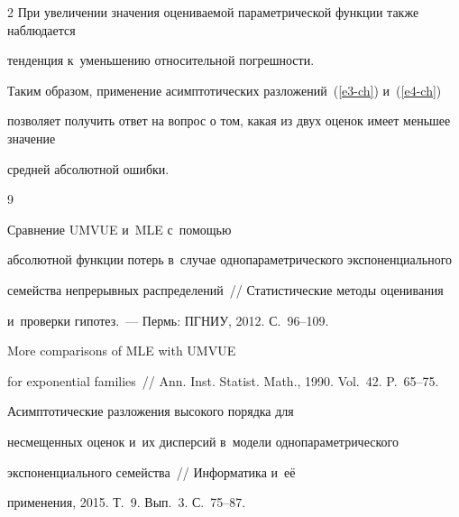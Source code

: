 \begin{multicols}{2}
 При увеличении значения оцениваемой параметрической функции также наблюдается


 тенденция к~уменьшению относительной погрешности.





 Таким образом, применение асимптотических разложений~(\ref{e3-ch}) и~(\ref{e4-ch}) 


 позволяет получить  ответ на вопрос о том, какая из двух оценок имеет меньшее значение 


 средней  абсолютной ошибки.


 










{\small\frenchspacing


 {%




 \begin{thebibliography}{9}







 Сравнение UMVUE и~MLE с~по\-мощью


  абсолютной функции потерь в~случае однопараметрического экспоненциального 


  семейства непрерывных распределений~// Статистические методы оценивания 


  и~проверки гипотез.~--- Пермь: ПГНИУ, 2012. С.~96--109.




  More comparisons of MLE with UMVUE


  for exponential families~// Ann. Inst. Statist. Math., 1990. Vol.~42. P.~65--75.




  Асимптотические разложения высокого порядка для


  несмещенных оценок и~их дисперсий в~модели однопараметрического 


  экспоненциального семейства~// Информатика и~её 


  применения, 2015. Т.~9. Вып.~3. С.~75--87.





\end{thebibliography}}}
\end{multicols}
